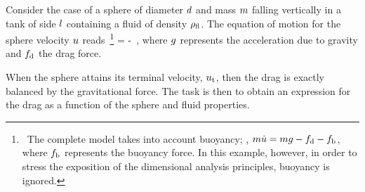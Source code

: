 \begin{example}
Consider the case of a sphere of diameter $d$ and mass $m$ falling vertically in a tank of side $l$ containing a fluid of density $\rho_\text{fl}$. The equation of motion for the sphere velocity $u$ reads~\footnote{~The complete model takes into account buoyancy; \ie, $m \dot{u} = mg - f_\text{d} - f_\text{b}$, where $f_\text{b}$ represents the buoyancy force. In this example, however, in order to stress the exposition of the dimensional analysis principles, buoyancy is ignored.}
\beq
\mass \dt\vel = \mass\grav - \drag\,,
\eeq
where $g$ represents the acceleration due to gravity and $f_\text{d}$ the drag force. 

When the sphere attains its terminal velocity, $u_\text{t}$, then the drag is exactly balanced by the gravitational force. The task is then to obtain an expression for the drag as a function of the sphere and fluid properties.
\end{example}

